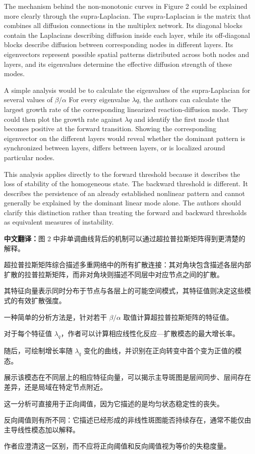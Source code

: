 \documentclass[a4paper,12pt]{article}
\newcommand{\zhtranslationfirst}[1]{%
    \par\medskip\noindent
    {\small\color{blue!60!black}\textbf{中文翻译：}#1}\par
}
\newcommand{\zhtranslation}[1]{%
    \par\smallskip\noindent
    {\small\color{blue!60!black}#1}\par
}
\begin{document}
\newpage
\begin{tcolorbox}[title = {Comment 3 Supra-Laplacian and dominant modes},fonttitle = \bfseries]
    The mechanism behind the non-monotonic curves in Figure 2 could be explained more clearly through the supra-Laplacian. The supra-Laplacian is the matrix that combines all diffusion connections in the multiplex network. Its diagonal blocks contain the Laplacians describing diffusion inside each layer, while its off-diagonal blocks describe diffusion between corresponding nodes in different layers. Its eigenvectors represent possible spatial patterns distributed across both nodes and layers, and its eigenvalues determine the effective diffusion strength of these modes.

    \medskip

    A simple analysis would be to calculate the eigenvalues of the supra-Laplacian for several values of $\beta / \alpha$ For every eigenvalue $\lambda q$, the authors can calculate the largest growth rate of the corresponding linearized reaction-diffusion mode. They could then plot the growth rate against $\lambda q$ and identify the first mode that becomes positive at the forward transition. Showing the corresponding eigenvector on the different layers would reveal whether the dominant pattern is synchronized between layers, differs between layers, or is localized around particular nodes.

    \medskip

    This analysis applies directly to the forward threshold because it describes the loss of stability of the homogeneous state. The backward threshold is different. It describes the persistence of an already established nonlinear pattern and cannot generally be explained by the dominant linear mode alone. The authors should clarify this distinction rather than treating the forward and backward thresholds as equivalent measures of instability.
    \zhtranslationfirst{图 2 中非单调曲线背后的机制可以通过超拉普拉斯矩阵得到更清楚的解释。}
    \zhtranslation{超拉普拉斯矩阵综合描述多重网络中的所有扩散连接：其对角块包含描述各层内部扩散的拉普拉斯矩阵，而非对角块则描述不同层中对应节点之间的扩散。}
    \zhtranslation{其特征向量表示同时分布于节点与各层上的可能空间模式，其特征值则决定这些模式的有效扩散强度。}

    \zhtranslation{一种简单的分析方法是，针对若干 $\beta / \alpha$ 取值计算超拉普拉斯矩阵的特征值。}
    \zhtranslation{对于每个特征值 $\lambda_q$，作者可以计算相应线性化反应—扩散模态的最大增长率。}
    \zhtranslation{随后，可绘制增长率随 $\lambda_q$ 变化的曲线，并识别在正向转变中首个变为正值的模态。}
    \zhtranslation{展示该模态在不同层上的相应特征向量，可以揭示主导斑图是层间同步、层间存在差异，还是局域在特定节点附近。}

    \zhtranslation{这一分析可直接用于正向阈值，因为它描述的是均匀状态稳定性的丧失。}
    \zhtranslation{反向阈值则有所不同：它描述已经形成的非线性斑图能否持续存在，通常不能仅由主导线性模态加以解释。}
    \zhtranslation{作者应澄清这一区别，而不应将正向阈值和反向阈值视为等价的失稳度量。}
\end{tcolorbox}
\end{document}
